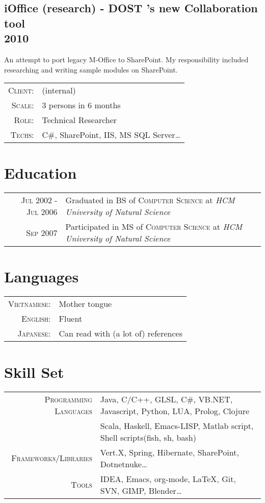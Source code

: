\documentclass[a4paper,10pt]{article}
\begin{document}
\subsection*{iOffice (research) - DOST 's new Collaboration tool\\\small 2010}

An attempt to port legacy M-Office to SharePoint.
My responsibility included researching and writing sample modules on SharePoint.

\begin{tabular}{rl}
    \textsc{Client:} & \small(internal) \\
    \textsc{Scale:} & 3 persons in 6 months\\
    \textsc{Role:} & Technical Researcher\\
    \textsc{Techs:} & C\#, SharePoint, IIS, MS SQL Server\ldots\\
\end{tabular}

\hfill
\section{Education}
\begin{tabular}{rl}
  \textsc{Jul} 2002 - \textsc{Jul} 2006 & Graduated in BS of \textsc{Computer Science} at \textit{HCM University of Natural Science}\\
  \textsc{Sep} 2007 & Participated in MS of \textsc{Computer Science} at \textit{HCM University of Natural Science}\\
\end{tabular}


\section{Languages}
\begin{tabular}{rl}
 \textsc{Vietnamese:} & Mother tongue\\
 \textsc{English:} & Fluent\\
 \textsc{Japanese:} & Can read with (a lot of) references\\
\end{tabular}

\section{Skill Set}
\begin{tabular}{rl}
    \textsc{Programming Languages} & Java, C/C++, GLSL, C\#, VB.NET, Javascript, Python, LUA, Prolog, Clojure\\
                                   & Scala, Haskell, Emacs-LISP, Matlab script, Shell scripts(fish, sh, bash) \\
    \textsc{Frameworks/Libraries} & Vert.X, Spring, Hibernate, SharePoint, Dotnetnuke\ldots \\
    \textsc{Tools} & IDEA, Emacs, org-mode, \LaTeX, Git, SVN, GIMP, Blender\ldots\\
\end{tabular}
\end{document}
